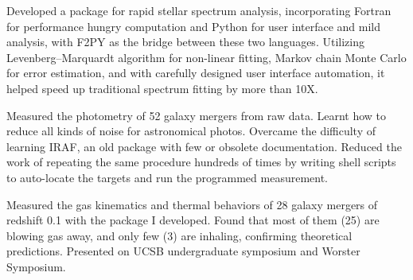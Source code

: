 \documentclass[letter,12pt]{article}
\begin{document}
\begin{zitemize}
\item Developed a package for rapid stellar spectrum analysis, incorporating Fortran for performance hungry computation and Python for user interface and mild analysis, with F2PY as the bridge between these two languages. Utilizing Levenberg–Marquardt algorithm for non-linear fitting, Markov chain Monte Carlo for error estimation, and with carefully designed user interface automation, it helped speed up traditional spectrum fitting by more than 10X. 
\item Measured the photometry of 52 galaxy mergers from raw data. Learnt how to reduce all kinds of noise for astronomical photos. Overcame the difficulty of learning IRAF, an old package with few or obsolete documentation. Reduced the work of repeating the same procedure hundreds of times by writing shell scripts to auto-locate the targets and run the programmed measurement. 
\item Measured the gas kinematics and thermal behaviors of 28 galaxy mergers of redshift 0.1 with the package I developed. Found that most of them (25) are blowing gas away, and only few (3) are inhaling, confirming theoretical predictions. Presented on UCSB undergraduate symposium and Worster Symposium.
\end{zitemize}
\end{document}
